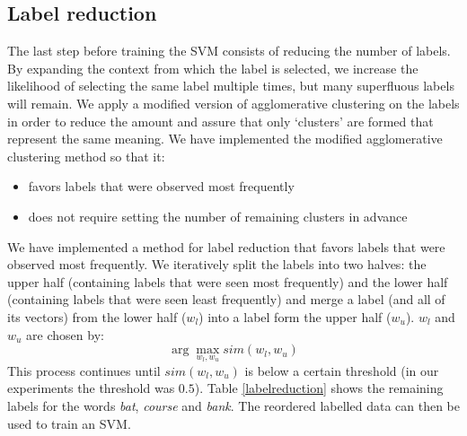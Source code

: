 \documentclass[11pt]{article}
\begin{document}
\subsection{Label reduction}
The last step before training the SVM consists of reducing the number of labels. By expanding the context from which the label is selected, we increase the likelihood of selecting the same label multiple times, but many superfluous labels will remain. We apply a modified version of agglomerative clustering on the labels in order to reduce the amount and assure that only `clusters' are formed that represent the same meaning. We have implemented the modified agglomerative clustering method so that it:
\begin{itemize}
\item favors labels that were observed most frequently
\item does not require setting the number of remaining clusters in advance
\end{itemize}
We have implemented a method for label reduction that favors labels that were observed most frequently. We iteratively split the labels into two halves: the upper half (containing labels that were seen most frequently) and the lower half (containing labels that were seen least frequently) and merge a label (and all of its vectors) from the lower half ($w_l$) into a label form the upper half ($w_u$). $w_l$ and $w_u$ are chosen by: 
$$\arg\max_{w_l, w_u} \textit{sim}(w_l, w_u)$$
This process continues until $\textit{sim}(w_l, w_u)$ is below a certain threshold (in our experiments the threshold was $0.5$). Table \ref{labelreduction} shows the remaining labels for the words \textit{bat}, \textit{course} and \textit{bank}.
The reordered labelled data can then be used to train an SVM.
\end{document}
